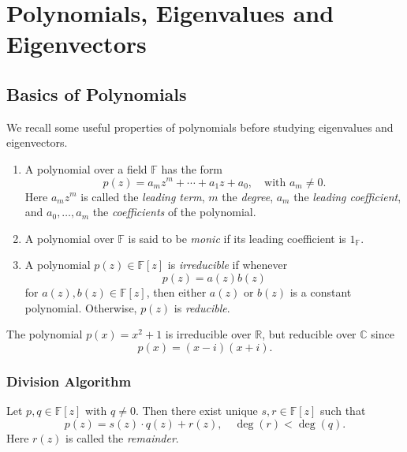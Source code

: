 \chapter{Polynomials, Eigenvalues and Eigenvectors}
\section{Basics of Polynomials}

We recall some useful properties of polynomials before studying eigenvalues and eigenvectors.

\begin{definition}[Polynomial]\label{def:polynomial}
\leavevmode
\begin{enumerate}
  \item A polynomial over a field \(\mathbb{F}\) has the form
  \[
  p(z) = a_m z^m + \cdots + a_1 z + a_0, \quad \text{with } a_m \neq 0.
  \]
  Here \(a_m z^m\) is called the \emph{leading term}, \(m\) the \emph{degree}, \(a_m\) the \emph{leading coefficient}, and \(a_0, \dots, a_m\) the \emph{coefficients} of the polynomial.

  \item A polynomial over \(\mathbb{F}\) is said to be \emph{monic} if its leading coefficient is \(1_\mathbb{F}\).

  \item A polynomial \(p(z) \in \mathbb{F}[z]\) is \emph{irreducible} if whenever
  \[
  p(z) = a(z) b(z)
  \]
  for \(a(z), b(z) \in \mathbb{F}[z]\), then either \(a(z)\) or \(b(z)\) is a constant polynomial. Otherwise, \(p(z)\) is \emph{reducible}.
\end{enumerate}
\end{definition}

\begin{example}\label{ex:irreducible}
The polynomial \(p(x) = x^2 + 1\) is irreducible over \(\mathbb{R}\), but reducible over \(\mathbb{C}\) since
\[
p(x) = (x - i)(x + i).
\]
\end{example}

\subsection{Division Algorithm}
\begin{theorem}\label{thm:division}
Let \(p, q \in \mathbb{F}[z]\) with \(q \neq 0\). Then there exist unique \(s, r \in \mathbb{F}[z]\) such that
\[
p(z) = s(z) \cdot q(z) + r(z), \quad \deg(r) < \deg(q).
\]
Here \(r(z)\) is called the \emph{remainder}.
\end{theorem}

